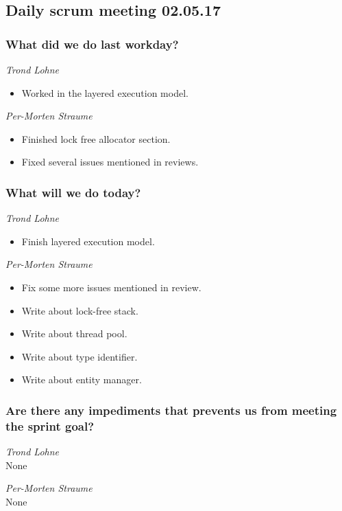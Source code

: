 \documentclass{article}
\begin{document}
\begin{center}
\subsection*{Daily scrum meeting 02.05.17}
\end{center}
\bigskip


\subsubsection*{What did we do last workday?}

\noindent\textit{Trond Lohne}
\begin{itemize}
	\item
	Worked in the layered execution model.
\end{itemize}

\medskip

\noindent\textit{Per-Morten Straume}
\begin{itemize}
	\item
	Finished lock free allocator section.

	\item
	Fixed several issues mentioned in reviews.
\end{itemize}


\subsubsection*{What will we do today?}

\noindent\textit{Trond Lohne}
\begin{itemize}
	\item
	Finish layered execution model.
\end{itemize}

\medskip

\noindent\textit{Per-Morten Straume}
\begin{itemize}
	\item
	Fix some more issues mentioned in review.

	\item
	Write about lock-free stack.

	\item
    Write about thread pool.

    \item
    Write about type identifier.

    \item
    Write about entity manager.
\end{itemize}


\subsubsection*{Are there any impediments that prevents us from meeting the sprint goal?}

\noindent\textit{Trond Lohne}\\
None

\medskip

\noindent\textit{Per-Morten Straume}\\
None
\end{document}
